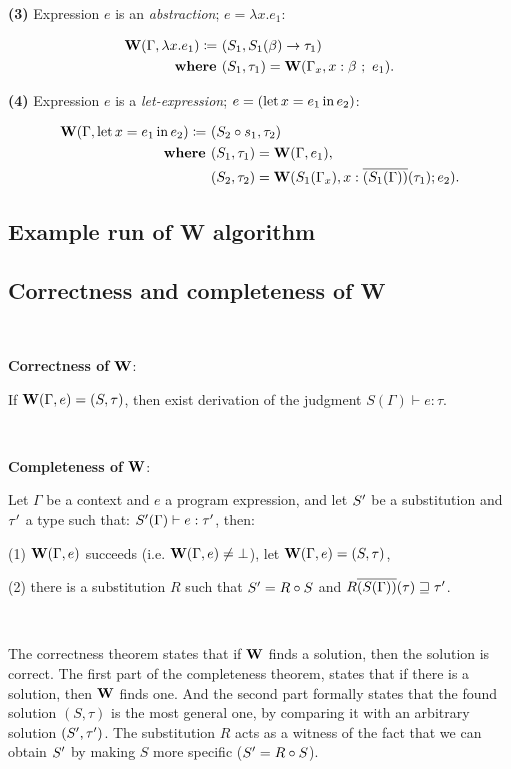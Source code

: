 \documentclass[a4paper,oneside]{memoir}
\begin{document}
\textbf{(3)} Expression $e$ is an \textit{abstraction}; $e = \lambda x . e_1$:

\begin{align*}
\operatorname{\textbf{W}}(\Gamma, \lambda x .e_1) \coloneqq ~ & (S_1, S_1(\beta) \rightarrow \tau_1 ) \\
\operatorname{\textbf{where~}} & (S_1, \tau_1) = \operatorname{\textbf{W}}(\Gamma_x, x : \beta ~;~ e_1). \\
\end{align*}



\textbf{(4)} Expression $e$ is a \textit{let-expression}; $e = (\operatorname{let}x = e_1 \operatorname{in} e_2)$:

\begin{align*}
\operatorname{\textbf{W}}(\Gamma, \operatorname{let}x = e_1 \operatorname{in} e_2) \coloneqq ~ & (S_2 \circ s_1, \tau_2) \\
\operatorname{\textbf{where~}} & (S_1, \tau_1) = \operatorname{\textbf{W}}(\Gamma, e_1), \\
       & (S_2, \tau_2) = \operatorname{\textbf{W}}(S_1(\Gamma_x),x:\overline{(S_1(\Gamma))}(\tau_1); e_2). \\
\end{align*}

\subsection{Example run of W algorithm}


\subsection{Correctness and completeness of W}

~

\textbf{Correctness of $\operatorname{\textbf{W}}$}:

If $\operatorname{\textbf{W}}(\Gamma, e) = (S, \tau)$, then exist derivation of the judgment $S(\Gamma) \vdash e : \tau$.

~

\textbf{Completeness of $\operatorname{\textbf{W}}$}:

Let $\Gamma$ be a context and $e$ a program expression,
and let $S^\prime$ be a substitution and $\tau^\prime$ a type such that:
$ S^\prime(\Gamma) \vdash e : \tau^\prime $, 
then:

(1) $\operatorname{\textbf{W}}(\Gamma,e)$ succeeds (i.e. $\operatorname{\textbf{W}}(\Gamma,e) \neq \bot$), 
let $\operatorname{\textbf{W}}(\Gamma,e) = (S, \tau)$,

(2) there is a substitution $R$ such that $S^\prime = R \circ S$ 
and $R\overline{(S(\Gamma))}(\tau) \sqsupseteq \tau^\prime$. 

~ 

The correctness theorem states that if $\operatorname{\textbf{W}}$ finds a solution, then the solution is correct.
The first part of the completeness theorem, states that if there is a solution, then $\operatorname{\textbf{W}}$ finds one. And the second part formally states that the found solution $(S,\tau)$ is the most general one, by comparing it with an arbitrary solution $(S^\prime,\tau^\prime)$. The substitution $R$ acts as a witness of the fact that we can obtain $S^\prime$ by making $S$ more specific ($S^\prime = R \circ S$).  
\end{document}
